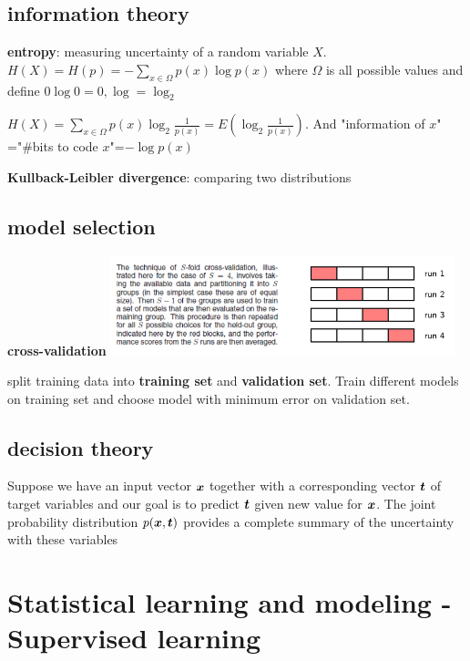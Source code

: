 \documentclass[11pt]{article}
\begin{document}
\subsection{information theory}
\label{sec:orgfeaf226}
\textbf{entropy}: measuring uncertainty of a random variable \(X\).
\(H(X)=H(p)=-\displaystyle\sum_{x\in\Omega}p(x)\log p(x)\) where \(\Omega\) is
all possible values and define \(0\log0=0,\log=\log_2\)

\(H(X)=\displaystyle\sum_{x\in\Omega}p(x)\log_2\frac{1}{p(x)}=
   E(\log_2\frac{1}{p(x)})\). And "information of \(x\)"​="\#bits to code \(x\)"​=\(-\log
   p(x)\)

\textbf{Kullback-Leibler divergence}: comparing two distributions
\subsection{model selection}
\label{sec:org17a366d}
\textbf{cross-validation}
\includegraphics[width=100mm]{CrossValidation}

split training data into \textbf{training set} and \textbf{validation set}. Train different
models on training set and choose model with minimum error on validation set.
\subsection{decision theory}
\label{sec:org4342659}
Suppose we have an input vector \(\boldsymbol{x}\) together with a corresponding vector
\(\boldsymbol{t}\) of target variables and our goal is to predict \(\boldsymbol{t}\) given new
value for \(\boldsymbol{x}\). The joint probability distribution \(p(\boldsymbol{x},\boldsymbol{t})\)
provides a complete summary of the uncertainty with these variables
\section{Statistical learning and modeling - Supervised learning}
\label{sec:org883f597}
\end{document}
